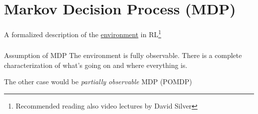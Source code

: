\section{Markov Decision Process (MDP)}


\begin{frame} 
    \begin{center}
    A formalized description of the \underline{environment} in RL\footnote{Recommended reading 
\citep{sutton1998introduction} also video lectures by David Silver}
    \end{center}
\end{frame}


\begin{frame}\frametitle{\secname}
    
\begin{block}{Assumption of MDP}
The environment is fully observable. There is a complete characterization of what's going on and where everything is.
\end{block}

The other case would be \emph{partially observable} MDP (POMDP)

\end{frame}


